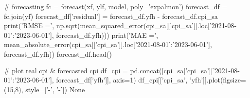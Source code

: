 \documentclass[a4paper, 12pt]{extarticle}
\begin{document}
\begin{python}
		# forecasting
		fc = forecast(xf, ylf, model, poly='expalmon')
		forecast_df = fc.join(yf)
		forecast_df['residual'] = forecast_df.yfh - forecast_df.cpi_sa
		print('RMSE =', np.sqrt(mean_squared_error(cpi_sa[['cpi_sa']].loc['2021-08-01':'2023-06-01'], forecast_df.yfh)))
		print('MAE =', mean_absolute_error(cpi_sa[['cpi_sa']].loc['2021-08-01':'2023-06-01'], forecast_df.yfh))
		forecast_df.head()
		
		# plot real cpi & forecasted cpi
		df_cpi = pd.concat([cpi_sa['cpi_sa']['2021-08-01':'2023-06-01'], forecast_df['yfh']], axis=1)
		df_cpi[['cpi_sa', 'yfh']].plot(figsize=(15,8), style=['-', '-'])
		None
	\end{python}
\end{document}
